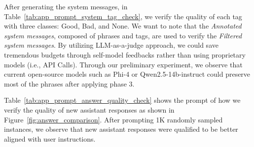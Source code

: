 After generating the system messages, in Table~\ref{tab:app_prompt_system_tag_check}, we verify the quality of each tag with three classes: Good, Bad, and None.
We want to note that the \textit{Annotated system messages}, composed of phrases and tags, are used to verify the \textit{Filtered system messages}.
By utilizing LLM-as-a-judge approach, we could save tremendous budgets through self-model feedbacks rather than using proprietary models (i.e., API Calls). 
Through our preliminary experiment, we observe that current open-source models such as Phi-4 or Qwen2.5-14b-instruct could preserve most of the phrases after applying phase 3.

Table~\ref{tab:app_prompt_answer_quality_check} shows the prompt of how we verify the quality of new assistant responses as shown in Figure~\ref{fig:answer_comparison}.
After prompting 1K randomly sampled instances, we observe that new assistant responses were qualified to be better aligned with user instructions.


